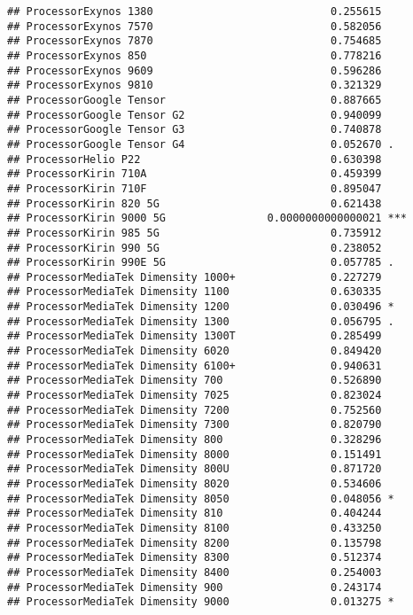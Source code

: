 \documentclass[
]{article}
\begin{document}
\begin{verbatim}
## ProcessorExynos 1380                            0.255615    
## ProcessorExynos 7570                            0.582056    
## ProcessorExynos 7870                            0.754685    
## ProcessorExynos 850                             0.778216    
## ProcessorExynos 9609                            0.596286    
## ProcessorExynos 9810                            0.321329    
## ProcessorGoogle Tensor                          0.887665    
## ProcessorGoogle Tensor G2                       0.940099    
## ProcessorGoogle Tensor G3                       0.740878    
## ProcessorGoogle Tensor G4                       0.052670 .  
## ProcessorHelio P22                              0.630398    
## ProcessorKirin 710A                             0.459399    
## ProcessorKirin 710F                             0.895047    
## ProcessorKirin 820 5G                           0.621438    
## ProcessorKirin 9000 5G                0.0000000000000021 ***
## ProcessorKirin 985 5G                           0.735912    
## ProcessorKirin 990 5G                           0.238052    
## ProcessorKirin 990E 5G                          0.057785 .  
## ProcessorMediaTek Dimensity 1000+               0.227279    
## ProcessorMediaTek Dimensity 1100                0.630335    
## ProcessorMediaTek Dimensity 1200                0.030496 *  
## ProcessorMediaTek Dimensity 1300                0.056795 .  
## ProcessorMediaTek Dimensity 1300T               0.285499    
## ProcessorMediaTek Dimensity 6020                0.849420    
## ProcessorMediaTek Dimensity 6100+               0.940631    
## ProcessorMediaTek Dimensity 700                 0.526890    
## ProcessorMediaTek Dimensity 7025                0.823024    
## ProcessorMediaTek Dimensity 7200                0.752560    
## ProcessorMediaTek Dimensity 7300                0.820790    
## ProcessorMediaTek Dimensity 800                 0.328296    
## ProcessorMediaTek Dimensity 8000                0.151491    
## ProcessorMediaTek Dimensity 800U                0.871720    
## ProcessorMediaTek Dimensity 8020                0.534606    
## ProcessorMediaTek Dimensity 8050                0.048056 *  
## ProcessorMediaTek Dimensity 810                 0.404244    
## ProcessorMediaTek Dimensity 8100                0.433250    
## ProcessorMediaTek Dimensity 8200                0.135798    
## ProcessorMediaTek Dimensity 8300                0.512374    
## ProcessorMediaTek Dimensity 8400                0.254003    
## ProcessorMediaTek Dimensity 900                 0.243174    
## ProcessorMediaTek Dimensity 9000                0.013275 *  

\end{verbatim}
\end{document}
